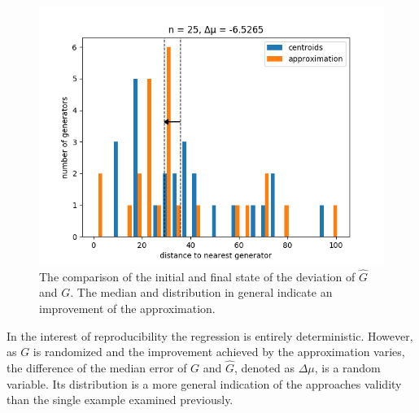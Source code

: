 \documentclass[a4paper]{article}
\begin{document}
\begin{figure}[H]
	\includegraphics[width=\textwidth]{generator_approximation_histogram.png}
	\caption{The comparison of the initial and final state of the deviation of \(\hat{G}\) and \(G\).
		The median and distribution in general indicate an improvement of the approximation.}
\end{figure}

In the interest of reproducibility the regression is entirely deterministic. However,
as \(G\) is randomized and the improvement achieved by the approximation varies,
the difference of the median error of \(G\) and \(\hat{G}\), denoted as \(\Delta\mu\), is a random variable.
Its distribution is a more general indication of the approaches validity than the single example examined previously.
\end{document}
